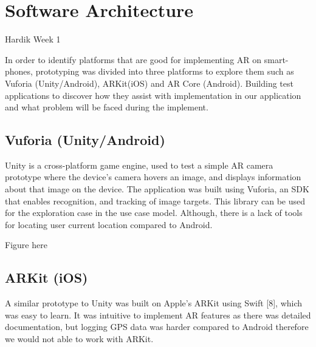 \section{Software Architecture}
Hardik Week 1

In order to identify platforms that are good for implementing AR on smart- phones, prototyping was divided into three platforms to explore them such as Vuforia (Unity/Android), ARKit(iOS) and AR Core (Android). Building test applications to discover how they assist with implementation in our application and what problem will be faced during the implement.

\subsection*{Vuforia (Unity/Android)}
Unity is a cross-platform game engine, used to test a simple AR camera prototype where the device’s camera hovers an image, and displays information about that image on the device. The application was built using Vuforia, an SDK that enables recognition, and tracking of image targets. This library can be used for the exploration case in the use case model. Although, there is a lack of tools for locating user current location compared to Android.

Figure here


\subsection*{ARKit (iOS)}
A similar prototype to Unity was built on Apple’s ARKit using Swift [8], which was easy to learn. It was intuitive to implement AR features as there was detailed documentation, but logging GPS data was harder compared to Android therefore we would not able to work with ARKit.

